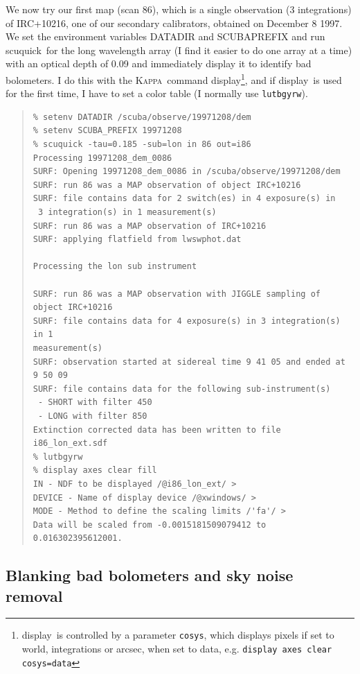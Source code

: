 \documentclass[twoside,11pt]{article}
\newenvironment{myquote}{\begin{quote}\begin{small}}{\end{small}\end{quote}}
\newcommand{\Kappa}{\xref{\textsc{Kappa}}{sun95}{}}
\newcommand{\task}[1]{\textsf{#1}}
\newcommand{\scuquick}{\xref{\task{scuquick}}{sun216}{SCUQUICK}}
\newcommand{\display}{\xref{\task{display}}{sun95}{DISPLAY}}
\newcommand{\xref}[3]{#1}
\newcommand{\xlabel}[1]{}
\renewcommand{\_}{\texttt{\symbol{95}}}
\begin{document}
We now try our first map (scan 86), which is a single observation (3
integrations) of IRC+10216, one of our secondary calibrators, obtained
on December 8 1997. We set the environment variables DATADIR and
SCUBA\_PREFIX and run \scuquick\ for the long wavelength array (I find
it easier to do one array at a time) with an optical depth of 0.09 and
immediately display it to identify bad bolometers.  I do this with
the \Kappa\ command \display \footnote{\display\ is controlled by a
parameter \texttt{cosys}, which displays pixels if set to world, integrations or
arcsec, when set to data, e.g. \texttt{display axes clear cosys=data}},
and if \display\ is used for the first time, I have to set a color
table (I normally use \texttt{lutbgyrw}).

\begin{myquote}
\begin{verbatim}
% setenv DATADIR /scuba/observe/19971208/dem
% setenv SCUBA_PREFIX 19971208
% scuquick -tau=0.185 -sub=lon in 86 out=i86
Processing 19971208_dem_0086
SURF: Opening 19971208_dem_0086 in /scuba/observe/19971208/dem
SURF: run 86 was a MAP observation of object IRC+10216
SURF: file contains data for 2 switch(es) in 4 exposure(s) in
 3 integration(s) in 1 measurement(s)
SURF: run 86 was a MAP observation of IRC+10216
SURF: applying flatfield from lwswphot.dat
 
Processing the lon sub instrument
 
SURF: run 86 was a MAP observation with JIGGLE sampling of object IRC+10216
SURF: file contains data for 4 exposure(s) in 3 integration(s) in 1
measurement(s)
SURF: observation started at sidereal time 9 41 05 and ended at 9 50 09
SURF: file contains data for the following sub-instrument(s)
 - SHORT with filter 450
 - LONG with filter 850
Extinction corrected data has been written to file i86_lon_ext.sdf
% lutbgyrw
% display axes clear fill
IN - NDF to be displayed /@i86_lon_ext/ >
DEVICE - Name of display device /@xwindows/ > 
MODE - Method to define the scaling limits /'fa'/ > 
Data will be scaled from -0.0015181509079412 to 0.016302395612001.
\end{verbatim}
\end{myquote}

\subsection{\xlabel{Blanking_and_remsky}Blanking bad bolometers and sky noise removal}
\end{document}
